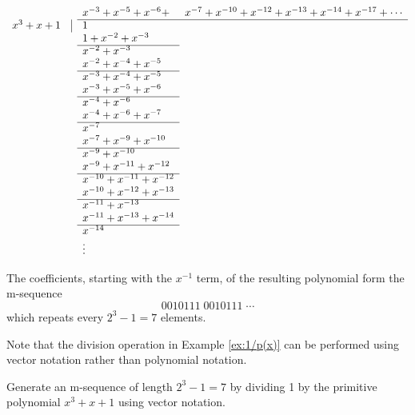 {\begin{example}
\begin{fsL}
\[
\begin{array}{rrll}
           &   & x^{-3} + x^{-5} + x^{-6} +& x^{-7} + x^{-10} + x^{-12} + x^{-13} + x^{-14} + x^{-17} + \cdots \\
   \cline{3-4}
   x^3+x+1 & \vline & 1 \\
           &        & 1 + x^{-2} + x^{-3} \\
   \cline{3-3}
           &        & x^{-2} + x^{-3} \\
           &        & x^{-2} + x^{-4} + x^{-5} \\
   \cline{3-3}
           &        & x^{-3} + x^{-4} + x^{-5} \\
           &        & x^{-3} + x^{-5} + x^{-6} \\
   \cline{3-3}
           &        & x^{-4} + x^{-6}          \\
           &        & x^{-4} + x^{-6} + x^{-7} \\
   \cline{3-3}
           &        & x^{-7}                   \\
           &        & x^{-7} + x^{-9} + x^{-10} \\
   \cline{3-3}
           &        & x^{-9} + x^{-10}         \\
           &        & x^{-9} + x^{-11} + x^{-12} \\
   \cline{3-3}
           &        & x^{-10} + x^{-11} + x^{-12} \\
           &        & x^{-10} + x^{-12} + x^{-13} \\
   \cline{3-3}
           &        & x^{-11} + x^{-13}          \\
           &        & x^{-11} + x^{-13} + x^{-14} \\
   \cline{3-3}
           &        & x^{-14}           \\
           &        & \vdots
\end{array}
\]
\end{fsL}
The coefficients, starting with the $x^{-1}$ term,
of the resulting polynomial form the m-sequence
\[ 0010111 \; 0010111 \; \cdots \]
which repeats every $2^3-1=7$ elements.
\end{example}


Note that the division operation in Example \ref{ex:1/p(x)}
can be performed using vector notation rather than polynomial notation.

\begin{example}
Generate an m-sequence of length $2^3-1=7$ by dividing 1 by the primitive polynomial
$x^3+x+1$ using vector notation.


\end{example}}
